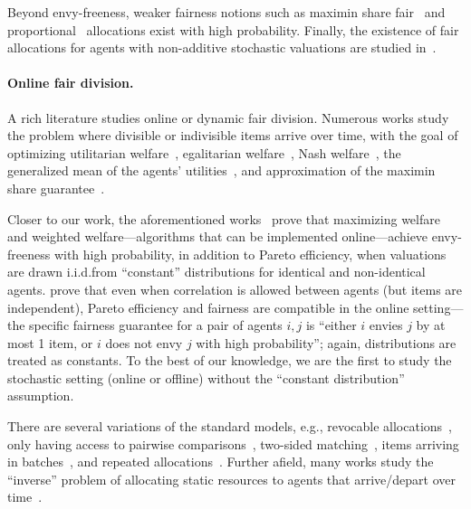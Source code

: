 Beyond envy-freeness, weaker fairness notions such as maximin share fair~\cite{kurokawa2016can,amanatidis2017approximation,farhadi2019fair} and proportional~\cite{suksompong2016asymptotic} allocations exist with high probability. Finally, the existence of fair allocations for agents with non-additive stochastic valuations are studied in~\cite{manurangsi2021closing,gan2019envy,benade2024existence}.


\paragraph{Online fair division.}
A rich literature studies online or dynamic fair division. Numerous works study the problem where divisible or indivisible items arrive over time, with the goal of optimizing utilitarian welfare~\cite{gkatzelis2021fair,bogomolnaia2022fair}, egalitarian welfare~\cite{springer2022online,kawase2022online}, Nash welfare~\cite{gao2021online,banerjee2022online,liao2022nonstationary,huang2023online,yang2024online}, the generalized mean of the agents' utilities~\cite{barman2022universal}, and approximation of the maximin share guarantee~\cite{zhou2023multi}.

Closer to our work, the aforementioned works~\cite{dickerson2014computational,bai2021envy} prove that maximizing welfare and weighted welfare---algorithms that can be implemented online---achieve envy-freeness with high probability, in addition to Pareto efficiency, when valuations are drawn i.i.d.\@ from ``constant'' distributions for identical and non-identical agents. \citet{benade2024fair} prove that even when correlation is allowed between agents (but items are independent), Pareto efficiency and fairness are compatible in the online setting---the specific fairness guarantee for a pair of agents $i,j$ is ``either $i$ envies $j$ by at most 1 item, or $i$ does not envy $j$ with high probability''; again, distributions are treated as constants. To the best of our knowledge, we are the first to study the stochastic setting (online or offline) without the ``constant distribution'' assumption.



There are several variations of the standard models, e.g., revocable allocations~\cite{he2019achieving,yang2023fairly}, only having access to pairwise comparisons~\cite{benade2025dynamic}, two-sided matching~\cite{mertzanidis2024}, items arriving in batches~\cite{benade2018make}, and repeated allocations~\cite{igarashi2024repeated}. Further afield, many works study the ``inverse'' problem of allocating static resources to agents that arrive/depart over time~\cite{kash2014no,li2018dynamic,sinclair2022sequential,vardi2022dynamic,banerjee2023online}.
